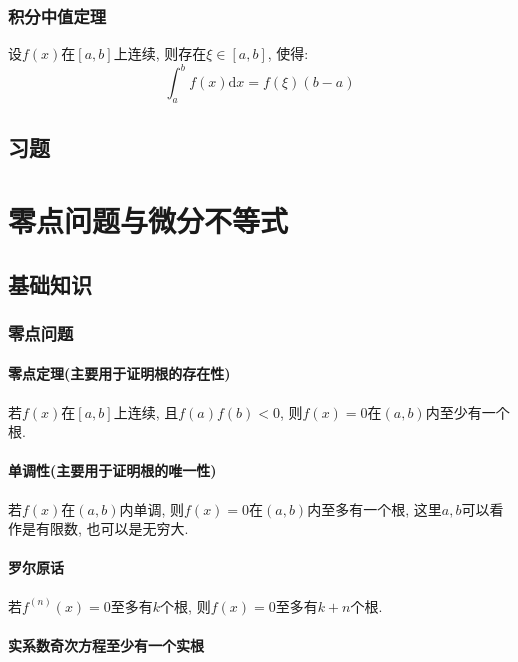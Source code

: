 \subsection{积分中值定理}
设$ f(x) $在$ [a,b] $上连续, 则存在$ \xi\in[a,b] $, 使得:
\begin{equation*}
\int_{a}^{b}f(x)\mathrm{d}x=f(\xi)(b-a)
\end{equation*}
\section{习题}
\chapter{零点问题与微分不等式}
\section{基础知识}
\subsection{零点问题}
\subsubsection{零点定理(主要用于证明根的存在性)}
若$ f(x) $在$ [a,b] $上连续, 且$ f(a)f(b)<0 $, 则$ f(x)=0 $在$ (a,b) $内至少有一个根.
\subsubsection{单调性(主要用于证明根的唯一性)}
若$ f(x) $在$ (a,b) $内单调, 则$ f(x)=0 $在$ (a,b) $内至多有一个根, 这里$ a,b $可以看作是有限数, 也可以是无穷大.
\subsubsection{罗尔原话}
若$ f^{(n)}(x)=0 $至多有$ k $个根, 则$ f(x)=0 $至多有$ k+n $个根.
\subsubsection{实系数奇次方程至少有一个实根}
